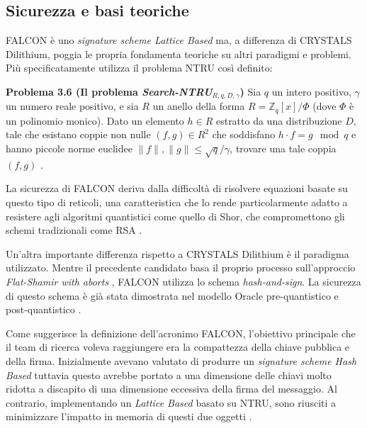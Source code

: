 \subsection{Sicurezza e basi teoriche}

FALCON è uno \textit{signature scheme Lattice Based} ma, a differenza di CRYSTALS Dilithium, poggia le propria fondamenta teoriche su altri paradigmi e problemi. Più specificatamente utilizza il problema NTRU così definito:

\begin{displayquote}[NIST IR 8413, 2022]
    \textbf{Problema 3.6 (Il problema \textit{Search-NTRU}$_{R,q,D,\gamma}$)} 
Sia $q$ un intero positivo, $\gamma$ un numero reale positivo, e sia $R$ un anello della forma $R = \mathbb{Z}_q[x]/\Phi$ (dove $\Phi$ è un polinomio monico). Dato un elemento $h \in R$ estratto da una distribuzione $D$, tale che esistano coppie non nulle $(f,g) \in R^2$ che soddisfano $h \cdot f = g \mod q$ e hanno piccole norme euclidee $\|f\|, \|g\| \leq \sqrt{q}/\gamma$, trovare una tale coppia $(f,g)$ \cite{NISTthirdReport}.
\end{displayquote}

La sicurezza di FALCON deriva dalla difficoltà di risolvere equazioni basate su questo tipo di reticoli, una caratteristica che lo rende particolarmente adatto a resistere agli algoritmi quantistici come quello di Shor, che compromettono gli schemi tradizionali come RSA \cite{falcon-submissionpackage-three}.

Un'altra importante differenza rispetto a CRYSTALS Dilithium è il paradigma utilizzato. Mentre il precedente candidato basa il proprio processo sull'approccio \textit{Flat-Shamir with aborts} , FALCON utilizza lo schema \textit{hash-and-sign}. La sicurezza di questo schema è già stata dimostrata nel modello Oracle pre-quantistico e post-quantistico \cite{falcon-submissionpackage-three}.

Come suggerisce la definizione dell'acronimo FALCON, l'obiettivo principale che il team di ricerca voleva raggiungere era la compattezza della chiave pubblica e della firma. Inizialmente avevano valutato di produrre un \textit{signature scheme Hash Based} tuttavia questo avrebbe portato a una dimensione delle chiavi molto ridotta a discapito di una dimensione eccessiva della firma del messaggio. Al contrario, implementando un \textit{Lattice Based} basato su NTRU, sono riusciti a minimizzare l'impatto in memoria di questi due oggetti \cite{falcon-submissionpackage-three}.

